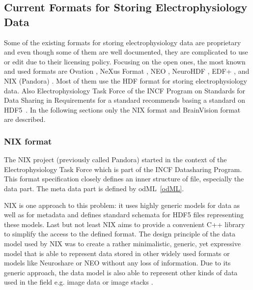 \documentclass[conference]{IEEEtran}
\begin{document}
\subsection{Current Formats for Storing Electrophysiology Data}
Some of the existing formats for storing electrophysiology data are proprietary and even though some of them are well documented, they are complicated to use or edit due to their licensing policy. Focusing on the open ones, the most known and used formats are Ovation \cite{ovation}, NeXus Format \cite{nexus}, NEO \cite{neo}, NeuroHDF \cite{neurohdf}, EDF+ \cite{kemp2003}, and NIX (Pandora) \cite{pandora}. Most of them use the HDF format for storing electrophysiology data. Also Electrophysiology Task Force of the INCF Program on Standards for Data Sharing in Requirements for a standard recommends basing a standard on HDF5~\cite{requirements}. In the following sections only the NIX format and BrainVision format are described.

\subsubsection{NIX format}
\label{nixsection}
The NIX project (previously called Pandora) started in the context of the Electrophysiology Task Force which is part of the INCF Datasharing Program. This format specification closely defines an inner structure of file, especially the data part. The meta data part is defined by odML~\ref{odML}.

NIX is one approach to this problem: it uses highly generic models for data as well as for metadata and defines standard schemata for HDF5 files representing these models. Last but not least NIX aims to provide a convenient C++ library to simplify the access to the defined format. The design principle of the data model used by NIX was to create a rather minimalistic, generic, yet expressive model that is able to represent data stored in other widely used formats or models like Neuroshare or NEO without any loss of information. Due to its generic approach, the data model is also able to represent other kinds of data used in the field e.g. image data or image stacks \cite{pandora}.
\end{document}
